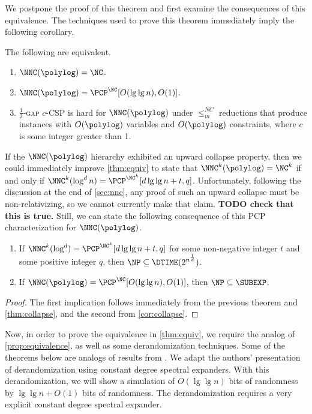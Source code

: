 \documentclass{article}
\begin{document}
We postpone the proof of this theorem and first examine the consequences of this equivalence.
The techniques used to prove this theorem immediately imply the following corollary.

\begin{corollary}
  The following are equivalent.
  \begin{enumerate}
  \item $\NNC(\polylog) = \NC$.
  \item $\NNC(\polylog) = \PCP^{\NC}[O(\lg \lg n), O(1)]$.
  \item \textsc{$\frac{1}{2}$-gap $c$-CSP} is hard for $\NNC(\polylog)$ under $\leq_m^{NC}$ reductions that produce instances with $O(\polylog)$ variables and $O(\polylog)$ constraints, where $c$ is some integer greater than 1.
  \end{enumerate}
\end{corollary}

If the $\NNC(\polylog)$ hierarchy exhibited an upward collapse property, then we could immediately improve \autoref{thm:equiv} to state that $\NNC^k(\polylog) = \NC^k$ if and only if $\NNC^k(\log^d n) = \PCP^{\NC^k}[d \lg \lg n + t, q]$.
Unfortunately, following the discussion at the end of \autoref{sec:nnc}, any proof of such an upward collapse must be non-relativizing, so we cannot currently make that claim.
\textbf{TODO check that this is true.}
Still, we can state the following consequence of this PCP characterization for $\NNC(\polylog)$.
\begin{corollary}
  \mbox{}
  \begin{enumerate}
  \item If $\NNC^k(\log^d) = \PCP^{\NC^k}[d \lg \lg n + t, q]$ for some non-negative integer $t$ and some positive integer $q$, then $\NP \subseteq \DTIME(2^{n^{\frac{1}{d}}})$.
  \item If $\NNC(\polylog) = \PCP^{\NC}[O(\lg \lg n), O(1)]$, then $\NP \subseteq \SUBEXP$.
  \end{enumerate}
\end{corollary}
\begin{proof}
  The first implication follows immediately from the previous theorem and \autoref{thm:collapse}, and the second from \autoref{cor:collapse}.
\end{proof}

Now, in order to prove the equivalence in \autoref{thm:equiv}, we require the \NC{} analog of \autoref{prop:equivalence}, as well as some derandomization techniques.
Some of the theorems below are \NC{} analogs of results from \cite{fs96}.
We adapt the authors' presentation of derandomization using constant degree spectral expanders.
With this derandomization, we will show a simulation of $O(\lg \lg n)$ bits of randomness by $\lg \lg n + O(1)$ bits of randomness.
The derandomization requires a very explicit constant degree spectral expander.
\end{document}

